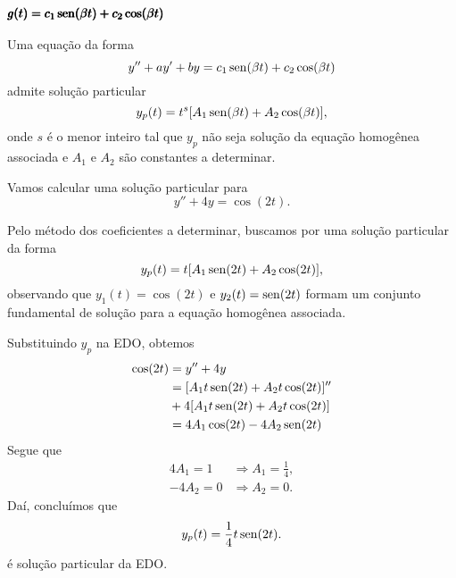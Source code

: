 \subsubsection{$\pmb{g(t) = c_1\operatorname{sen}(\beta t) + c_2\cos(\beta t)}$}

Uma equação da forma
\begin{equation}
  y'' + ay' + by = c_1\operatorname{sen}(\beta t) + c_2\cos(\beta t)
\end{equation}
admite solução particular
\begin{equation}
  y_p(t) = t^s[A_1\operatorname{sen}(\beta t) + A_2\cos(\beta t)],
\end{equation}
onde $s$ é o menor inteiro tal que $y_p$ não seja solução da equação homogênea associada e $A_1$ e $A_2$ são constantes a determinar.

\begin{ex}
  Vamos calcular uma solução particular para
  \begin{equation}
    y'' + 4y = \cos(2t).
  \end{equation}

  Pelo método dos coeficientes a determinar, buscamos por uma solução particular da forma
  \begin{equation}
    y_p(t) = t[A_1\operatorname{sen}(2t) + A_2\cos(2t)],
  \end{equation}
  observando que $y_1(t) = \cos(2t)$ e $y_2(t) = \operatorname{sen}(2t)$ formam um conjunto fundamental de solução para a equação homogênea associada.
  
  Substituindo $y_p$ na EDO, obtemos
  \begin{align}
    \cos(2t) &= y'' + 4y \\
             &= [A_1t\operatorname{sen}(2t) + A_2t\cos(2t)]'' \\
             &+ 4[A_1t\operatorname{sen}(2t) + A_2t\cos(2t)] \\
             &= 4A_1\cos(2t) - 4A_2\operatorname{sen}(2t)
  \end{align}
  Segue que
  \begin{align}
    4A_1 = 1 &\Rightarrow A_1 = \frac{1}{4},\\
    -4A_2 = 0 &\Rightarrow A_2 = 0.
  \end{align}
  Daí, concluímos que
  \begin{equation}
    y_p(t) = \frac{1}{4}t\operatorname{sen}(2t).
  \end{equation}
  é solução particular da EDO.
\end{ex}


